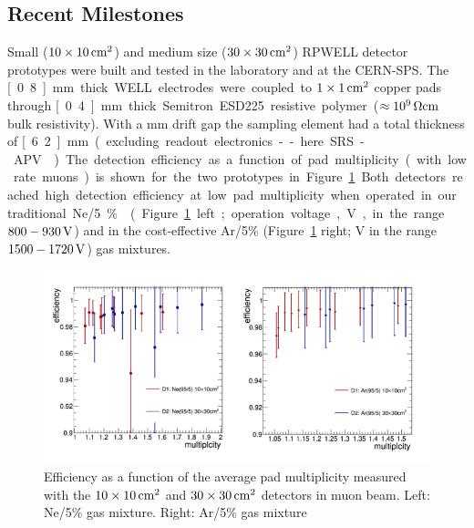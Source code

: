 \subsection{Recent Milestones}
Small ($\unit[10\times 10]{cm^2}$) and medium size ($\unit[30\times 30]{cm^2}$) RPWELL detector prototypes were built and tested in the laboratory and at the CERN-SPS. The \unit[0.8]{mm} thick WELL electrodes were coupled to $\unit[1\times 1]{cm^2}$ copper pads through \unit[0.4]{mm} thick Semitron ESD225 resistive polymer ($\approx \unit[10^9]{\Omega cm}$ bulk resistivity). With a \unit[5]{mm} drift gap the sampling element had a total thickness of \unit[6.2]{mm} (excluding readout electronics -- here SRS-APV~\cite{1748-0221-8-03-C03015,French2001359}).
The detection efficiency as a function of pad multiplicity (with low rate muons) is shown for the two prototypes in Figure~\ref{fig:Calorimeter:THGEM:efficiencyVSMultiplicity}. Both detectors reached high detection efficiency at low pad multiplicity when operated in our traditional Ne/5\% (Figure~\ref{fig:Calorimeter:THGEM:efficiencyVSMultiplicity} left; operation voltage, V, in the range $800-\unit[930]{V}$) and in the cost-effective Ar/5\% (Figure~\ref{fig:Calorimeter:THGEM:efficiencyVSMultiplicity} right; V in the range $1500-\unit[1720]{V}$) gas mixtures.
\begin{figure}
	\centering
	\includegraphics[width=.9\textwidth]{Calorimeter/THGEM/efficiencyVSMultiplicity.png}
	\caption{Efficiency as a function of the average pad multiplicity measured with the $\unit[10\times 10]{cm^2}$ and $\unit[30\times 30]{cm^2}$ detectors in muon beam. Left: Ne/5\% gas mixture. Right: Ar/5\% gas mixture}
	\label{fig:Calorimeter:THGEM:efficiencyVSMultiplicity}
\end{figure}
